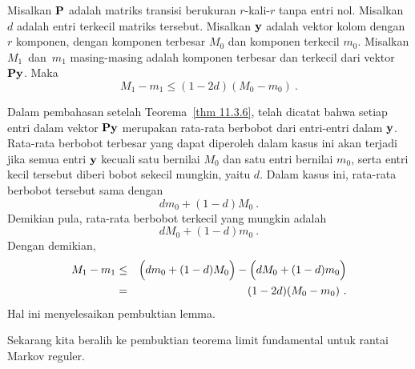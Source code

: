 \begin{lemma}
Misalkan ${\mbox{\bf P}\/}$ adalah matriks transisi berukuran $r$-kali-$r$ tanpa entri nol.
Misalkan $d$ adalah
entri terkecil matriks tersebut. Misalkan ${\mbox{\bf y}\/}$ adalah vektor kolom dengan
$r$ komponen, dengan komponen terbesar $M_0$ dan komponen terkecil $m_0$.
Misalkan $M_1$~dan~$m_1$ masing-masing adalah komponen terbesar dan terkecil dari
vektor ${\mbox{\bf P}\/} {\mbox{\bf y}\/}$. Maka
$$
M_1 - m_1 \leq (1 - 2d)(M_0 - m_0)\ .
$$

\proof
Dalam pembahasan setelah Teorema~\ref{thm 11.3.6}, telah dicatat bahwa setiap
entri dalam vektor
${\mbox{\bf P}\/}{\mbox{\bf y}\/}$ merupakan rata-rata berbobot dari entri-entri dalam ${\mbox{\bf y}\/}$.
Rata-rata berbobot terbesar
yang dapat diperoleh dalam kasus ini akan terjadi jika semua entri
${\mbox{\bf y}\/}$ kecuali satu
bernilai $M_0$ dan satu entri bernilai $m_0$, serta entri kecil tersebut
diberi bobot sekecil mungkin, yaitu $d$. Dalam kasus ini, rata-rata berbobot
tersebut sama dengan
$$dm_0 + (1-d)M_0\ .$$
Demikian pula, rata-rata berbobot terkecil yang mungkin adalah
$$dM_0 + (1-d)m_0\ .$$
Dengan demikian,
\begin{eqnarray*}
M_1 - m_1 &\le& \Bigl(dm_0 + (1-d)M_0\Bigr) - \Bigl(dM_0 + (1-d)m_0\Bigr) \\
          &=& (1 - 2d)(M_0 - m_0)\ .
\end{eqnarray*}
Hal ini menyelesaikan pembuktian lemma.
\end{lemma}

Sekarang kita beralih ke pembuktian teorema limit fundamental untuk rantai
Markov reguler.

